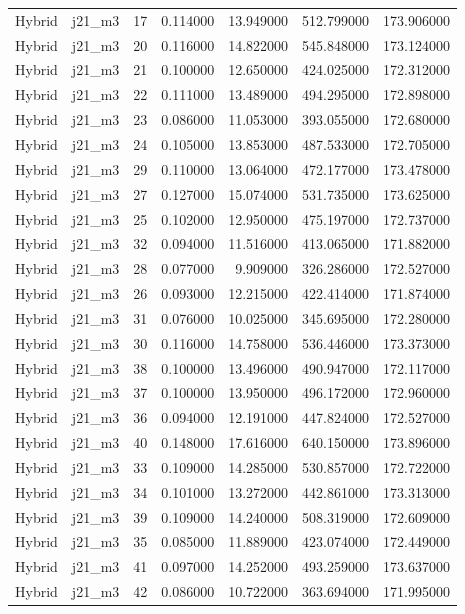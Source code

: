 \begin{tabular}{llrrrrr}
Hybrid & j21_m3 & 17 & 0.114000 & 13.949000 & 512.799000 & 173.906000 \\
Hybrid & j21_m3 & 20 & 0.116000 & 14.822000 & 545.848000 & 173.124000 \\
Hybrid & j21_m3 & 21 & 0.100000 & 12.650000 & 424.025000 & 172.312000 \\
Hybrid & j21_m3 & 22 & 0.111000 & 13.489000 & 494.295000 & 172.898000 \\
Hybrid & j21_m3 & 23 & 0.086000 & 11.053000 & 393.055000 & 172.680000 \\
Hybrid & j21_m3 & 24 & 0.105000 & 13.853000 & 487.533000 & 172.705000 \\
Hybrid & j21_m3 & 29 & 0.110000 & 13.064000 & 472.177000 & 173.478000 \\
Hybrid & j21_m3 & 27 & 0.127000 & 15.074000 & 531.735000 & 173.625000 \\
Hybrid & j21_m3 & 25 & 0.102000 & 12.950000 & 475.197000 & 172.737000 \\
Hybrid & j21_m3 & 32 & 0.094000 & 11.516000 & 413.065000 & 171.882000 \\
Hybrid & j21_m3 & 28 & 0.077000 & 9.909000 & 326.286000 & 172.527000 \\
Hybrid & j21_m3 & 26 & 0.093000 & 12.215000 & 422.414000 & 171.874000 \\
Hybrid & j21_m3 & 31 & 0.076000 & 10.025000 & 345.695000 & 172.280000 \\
Hybrid & j21_m3 & 30 & 0.116000 & 14.758000 & 536.446000 & 173.373000 \\
Hybrid & j21_m3 & 38 & 0.100000 & 13.496000 & 490.947000 & 172.117000 \\
Hybrid & j21_m3 & 37 & 0.100000 & 13.950000 & 496.172000 & 172.960000 \\
Hybrid & j21_m3 & 36 & 0.094000 & 12.191000 & 447.824000 & 172.527000 \\
Hybrid & j21_m3 & 40 & 0.148000 & 17.616000 & 640.150000 & 173.896000 \\
Hybrid & j21_m3 & 33 & 0.109000 & 14.285000 & 530.857000 & 172.722000 \\
Hybrid & j21_m3 & 34 & 0.101000 & 13.272000 & 442.861000 & 173.313000 \\
Hybrid & j21_m3 & 39 & 0.109000 & 14.240000 & 508.319000 & 172.609000 \\
Hybrid & j21_m3 & 35 & 0.085000 & 11.889000 & 423.074000 & 172.449000 \\
Hybrid & j21_m3 & 41 & 0.097000 & 14.252000 & 493.259000 & 173.637000 \\
Hybrid & j21_m3 & 42 & 0.086000 & 10.722000 & 363.694000 & 171.995000 \\

\end{tabular}
